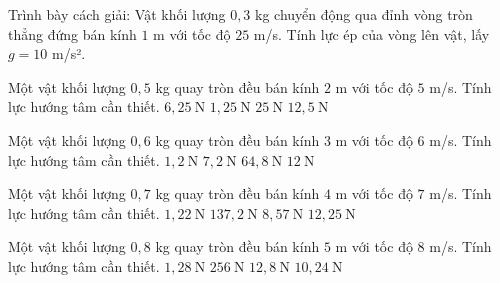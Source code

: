 \begin{bt}
Trình bày cách giải: Vật khối lượng $0,3$ kg chuyển động qua đỉnh vòng tròn thẳng đứng bán kính $1$ m với tốc độ $25$ m/s. Tính lực ép của vòng lên vật, lấy $g=10$ m/s².
\end{bt}

\begin{ex}
Một vật khối lượng $0,5$ kg quay tròn đều bán kính $2$ m với tốc độ $5$ m/s. Tính lực hướng tâm cần thiết.
\choice
{\True $6,25\ \mathrm{N}$}
{$1,25\ \mathrm{N}$}
{$25\ \mathrm{N}$}
{$12,5\ \mathrm{N}$}
\end{ex}

\begin{ex}
Một vật khối lượng $0,6$ kg quay tròn đều bán kính $3$ m với tốc độ $6$ m/s. Tính lực hướng tâm cần thiết.
\choice
{$1,2\ \mathrm{N}$}
{\True $7,2\ \mathrm{N}$}
{$64,8\ \mathrm{N}$}
{$12\ \mathrm{N}$}
\end{ex}

\begin{ex}
Một vật khối lượng $0,7$ kg quay tròn đều bán kính $4$ m với tốc độ $7$ m/s. Tính lực hướng tâm cần thiết.
\choice
{$1,22\ \mathrm{N}$}
{$137,2\ \mathrm{N}$}
{\True $8,57\ \mathrm{N}$}
{$12,25\ \mathrm{N}$}
\end{ex}

\begin{ex}
Một vật khối lượng $0,8$ kg quay tròn đều bán kính $5$ m với tốc độ $8$ m/s. Tính lực hướng tâm cần thiết.
\choice
{$1,28\ \mathrm{N}$}
{$256\ \mathrm{N}$}
{$12,8\ \mathrm{N}$}
{\True $10,24\ \mathrm{N}$}
\end{ex}

